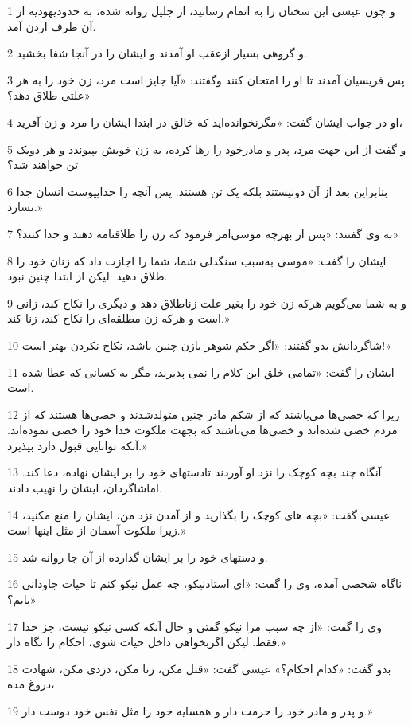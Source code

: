 \par 1 و چون عیسی این سخنان را به اتمام رسانید، از جلیل روانه شده، به حدودیهودیه از آن طرف اردن آمد.
\par 2 و گروهی بسیار ازعقب او آمدند و ایشان را در آنجا شفا بخشید.
\par 3 پس فریسیان آمدند تا او را امتحان کنند وگفتند: «آیا جایز است مرد، زن خود را به هر علتی طلاق دهد؟»
\par 4 او در جواب ایشان گفت: «مگرنخوانده‌اید که خالق در ابتدا ایشان را مرد و زن آفرید،
\par 5 و گفت از این جهت مرد، پدر و مادرخود را رها کرده، به زن خویش بپیوندد و هر دویک تن خواهند شد؟
\par 6 بنابراین بعد از آن دونیستند بلکه یک تن هستند. پس آنچه را خداپیوست انسان جدا نسازد.»
\par 7 به وی گفتند: «پس از بهر‌چه موسی‌امر فرمود که زن را طلاقنامه دهند و جدا کنند؟»
\par 8 ایشان را گفت: «موسی به‌سبب سنگدلی شما، شما را اجازت داد که زنان خود را طلاق دهید. لیکن از ابتدا چنین نبود.
\par 9 و به شما می‌گویم هر‌که زن خود را بغیر علت زناطلاق دهد و دیگری را نکاح کند، زانی است و هرکه زن مطلقه‌ای را نکاح کند، زنا کند.»
\par 10 شاگردانش بدو گفتند: «اگر حکم شوهر بازن چنین باشد، نکاح نکردن بهتر است!»
\par 11 ایشان را گفت: «تمامی خلق این کلام را نمی پذیرند، مگر به کسانی که عطا شده است.
\par 12 زیرا که خصی‌ها می‌باشند که از شکم مادر چنین متولدشدند و خصی‌ها هستند که از مردم خصی شده‌اند و خصی‌ها می‌باشند که بجهت ملکوت خدا خود را خصی نموده‌اند. آنکه توانایی قبول دارد بپذیرد.»
\par 13 آنگاه چند بچه کوچک را نزد او آوردند تادستهای خود را بر ایشان نهاده، دعا کند. اماشاگردان، ایشان را نهیب دادند.
\par 14 عیسی گفت: «بچه های کوچک را بگذارید و از آمدن نزد من، ایشان را منع مکنید، زیرا ملکوت آسمان از مثل اینها است.»
\par 15 و دستهای خود را بر ایشان گذارده از آن جا روانه شد.
\par 16 ناگاه شخصی آمده، وی را گفت: «ای استادنیکو، چه عمل نیکو کنم تا حیات جاودانی یابم؟»
\par 17 وی را گفت: «از چه سبب مرا نیکو گفتی و حال آنکه کسی نیکو نیست، جز خدا فقط. لیکن اگربخواهی داخل حیات شوی، احکام را نگاه دار.»
\par 18 بدو گفت: «کدام احکام؟» عیسی گفت: «قتل مکن، زنا مکن، دزدی مکن، شهادت دروغ مده،
\par 19 و پدر و مادر خود را حرمت دار و همسایه خود را مثل نفس خود دوست دار.»
